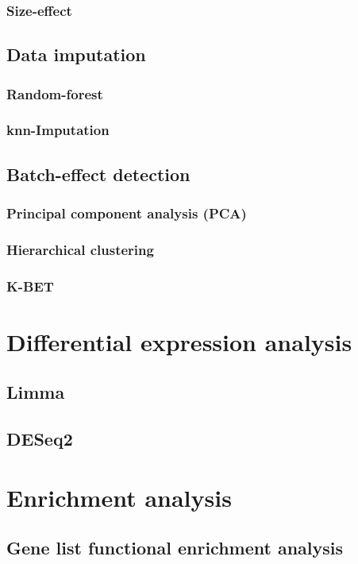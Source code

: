         \subsubsection{Size-effect}
    \subsection{Data imputation}
        \subsubsection{Random-forest}
        \subsubsection{knn-Imputation}
    \subsection{Batch-effect detection}
        \subsubsection{Principal component analysis (PCA)}
        \subsubsection{Hierarchical clustering}
        \subsubsection{K-BET}

\section{Differential expression analysis}
    \subsection{Limma}
    \subsection{DESeq2}
    
\section{Enrichment analysis}
    \subsection{Gene list functional enrichment analysis}

